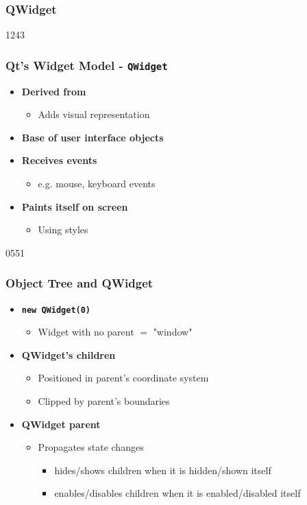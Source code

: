 \subsubsection{QWidget}
\begin{slide}{1243}
  \frametitle{Qt's Widget Model - \texttt{QWidget}}
  \begin{itemize}
 \item \textbf{Derived from }
    \begin{itemize}
    \item Adds visual representation
    \end{itemize}
  \item \textbf{Base of user interface objects}
  \item \textbf{Receives events}
    \begin{itemize}
    \item e.g. mouse, keyboard events
    \end{itemize}
  \item \textbf{Paints itself on screen}
    \begin{itemize}
    \item Using styles
    \end{itemize}
\end{itemize}
\end{slide}


\begin{slide}[fragile]{0551}\frametitle{Object Tree and QWidget}
  \begin{itemize}
  \item \textbf{\texttt{new QWidget(0)}}
    \begin{itemize}
    \item Widget with no parent $=$ "window"
    \end{itemize}
  \item \textbf{QWidget's children}
    \begin{itemize}
    \item Positioned in parent's coordinate system
    \item Clipped by parent's boundaries
    \end{itemize}
  \item \textbf{QWidget parent }
    \begin{itemize}
    \item Propagates state changes
      \begin{itemize}
      \item hides/shows children when it is hidden/shown itself
      \item enables/disables children when it is enabled/disabled itself
      \end{itemize}
    \end{itemize}
 \end{itemize}
\end{slide}

